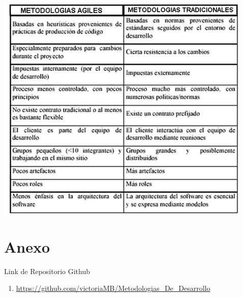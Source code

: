 \documentclass[a4paper,11pt]{article}
\begin{document}
    \includegraphics{comparativo}
\newpage
 
\section{Anexo }

Link de Repositorio Github\\
\begin{enumerate}
\item \url{https://github.com/victoriaMB/Metodologias_De_Desarrollo}
\end{enumerate}
\end{document}
